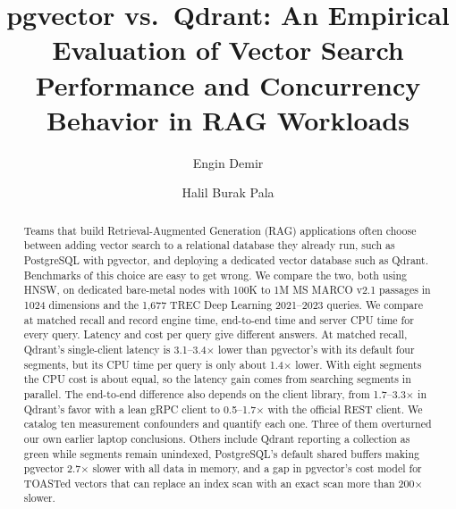 \documentclass[sigconf, nonacm]{acmart}
\begin{document}
\title{pgvector vs.\ Qdrant: An Empirical Evaluation of Vector Search\\
Performance and Concurrency Behavior in RAG Workloads}

\author{Engin Demir}

\author{Halil Burak Pala}

\renewcommand{\shortauthors}{Demir and Pala}

\begin{abstract}
Teams that build Retrieval-Augmented Generation (RAG) applications often choose between
adding vector search to a relational database they already run, such as PostgreSQL with
pgvector, and deploying a dedicated vector database such as Qdrant. Benchmarks of this
choice are easy to get wrong. We compare the two, both using HNSW, on dedicated
bare-metal nodes with 100K to 1M MS MARCO v2.1 passages in 1024 dimensions and the
1{,}677 TREC Deep Learning 2021--2023 queries. We compare at matched recall and record
engine time, end-to-end time and server CPU time for every query. Latency and cost per
query give different answers. At matched recall, Qdrant's single-client latency is
3.1--3.4$\times$ lower than pgvector's with its default four segments, but its CPU time
per query is only about 1.4$\times$ lower. With eight segments the CPU cost is about
equal, so the latency gain comes from searching segments in parallel. The end-to-end
difference also depends on the client library, from 1.7--3.3$\times$ in Qdrant's favor
with a lean gRPC client to 0.5--1.7$\times$ with the official REST client. We catalog ten
measurement confounders and quantify each one. Three of them overturned our own earlier
laptop conclusions. Others include Qdrant reporting a collection as green while segments
remain unindexed, PostgreSQL's default shared buffers making pgvector 2.7$\times$ slower
with all data in memory, and a gap in pgvector's cost model for TOASTed vectors that can
replace an index scan with an exact scan more than 200$\times$ slower.
\end{abstract}
\end{document}
